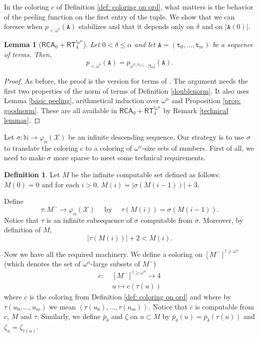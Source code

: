 \documentclass[11pt]{amsart}
\newtheorem{lemma}[thm]{Lemma}
\theoremstyle{definition}
\newtheorem{definition}[thm]{Definition}
\theoremstyle{remark}
\theoremstyle{plain}
\newcommand{\numberset}{\mathbb}
\newcommand{\N}{\numberset{N}}
\def\X{\mathcal{X}}
\def\om{\omega}
\def\a{\alpha}
\def\d{\delta}
\def\z{\zeta}
\def\pbar{\bar{p}}
\newcommand{\RCA}{\mathsf{RCA}_0}
\newcommand{\RT}{\mathsf{RT}}
\def\N{{\mathbb{N}}}
\begin{document}
In the coloring $c$ of Definition \ref{def: coloring on ord}, what matters is the behavior of the peeling function on the first entry of the tuple.
We show that we can foresee when $p_{ < \om^\d} (\mathtt{A})$ stabilizes and that it depends only on $\d$ and on $|\mathtt{A}(0)|$.

\begin{lemma}[$\RCA + \RT^{! \om^\a}_4$]\label{convergence lemma}
Let $0 < \d \le \a$ and let $\mathtt{A} = (\mathtt{t}_0, \ldots, \mathtt{t}_m)$ be a sequence of terms.
Then, 
$$p_{< \om^\d} (\mathtt{A}) = p_{\om^{\d[|\mathtt{t}_0|]} \cdot |\mathtt{t}_0|}(\mathtt{A}).$$ 
\end{lemma}

\begin{proof}
As before, the proof is the version for terms of \cite[Lemma 6.11]{marcone2025}.
The argument needs the first two properties of the norm of terms of Definition \ref{doublenorm}.
It also uses Lemma \ref{basic peeling}, arithmetical induction over $\om^\a$ and Proposition \ref{prop: goodnorm}.
These are all available in $\RCA + \RT^{! \om^\a}_4$ by Remark \ref{technical lemmas}.
\end{proof}

Let $\sigma \colon \N \to \varphi_\a(\X)$ be an infinite descending sequence.
Our strategy is to use $\sigma$ to translate the coloring $c$ to a coloring of $\om^\a$-size sets of numbers.
First of all, we need to make $\sigma$ more sparse to meet some technical requirements.

\begin{definition}\label{infinite set M}
Let $M$ be the infinite computable set defined as follows: $M(0) = 0$ and for each $i > 0$, $M(i) = |\sigma(M(i-1))| + 3$.
\end{definition}

Define
$$\tau \colon M^- \to \varphi_\a (\X) \quad \text{ by } \quad \tau(M(i)) = \sigma(M(i-1)).$$
Notice that $\tau$ is an infinite subsequence of $\sigma$ computable from $\sigma$.
Moreover, by definition of $M$, 
$$|\tau(M(i))| + 2 < M(i).$$		
		
Now we have all the required machinery.
We define a coloring on $[M^-]^{! \ge \om^\a}$ (which denotes the set of $\om^\a$-large subsets of $M^-$)
\begin{align*}
    \overline{c} \colon & \,\, [M^-]^{! \ge \om^\a} \to 4	\\
    & \,\, u \mapsto c(\tau(u))
\end{align*}
where $c$ is the coloring from Definition \ref{def: coloring on ord} and where by $\tau(u_0, \ldots, u_m)$ we mean $(\tau(u_0), \ldots, \tau(u_m))$.
Notice that $\overline{c}$ is computable from $c$, $M$ and $\tau$.
Similarly, we define $\pbar_\d$ and $\z$ on $u \subset M$ by  $\pbar_\d (u) = \pbar_\d(\tau(u))$ and $\z_u = \z_{\tau(u)}$.
		
\end{document}
